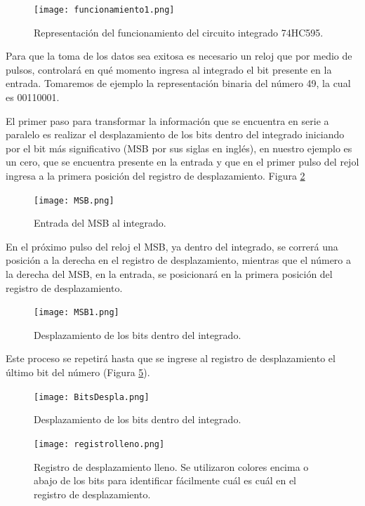 \documentclass{article}
\begin{document}
\newpage

\begin{figure}[h]
\texttt{[image: funcionamiento1.png]}
\centering
\caption{Representación del funcionamiento del circuito integrado 74HC595.}
\label{fig:func1}
\end{figure}

Para que la toma de los datos sea exitosa es necesario un reloj que por medio de pulsos, controlará en qué momento ingresa al integrado el bit presente en la entrada. Tomaremos de ejemplo la representación binaria del número 49, la cual es 00110001.

El primer paso para transformar la información que se encuentra en serie a paralelo es realizar el desplazamiento de los bits dentro del integrado iniciando por el bit más significativo (MSB por sus siglas en inglés), en nuestro ejemplo es un cero, que se encuentra presente en la entrada y que en el primer pulso del rejol ingresa a la primera posición del registro de desplazamiento. Figura \ref{fig:MSB}

\begin{figure}[h]
\texttt{[image: MSB.png]}
\centering
\caption{Entrada del MSB al integrado.}
\label{fig:MSB}
\end{figure}

En el próximo pulso del reloj el MSB, ya dentro del integrado, se correrá una posición a la derecha en el registro de desplazamiento, mientras que el número a la derecha del MSB, en la entrada, se posicionará en la primera posición del registro de desplazamiento.


\begin{figure}[h]
\texttt{[image: MSB1.png]}
\centering
\caption{Desplazamiento de los bits dentro del integrado.}
\label{fig:MSB1}
\end{figure}

Este proceso se repetirá hasta que se ingrese al registro de desplazamiento el último bit del número (Figura \ref{fig:registrolleno}).

\begin{figure}[h]
\texttt{[image: BitsDespla.png]}
\centering
\caption{Desplazamiento de los bits dentro del integrado.}
\label{fig:bitsdespla}
\end{figure}

\newpage
\begin{figure}[h]
\texttt{[image: registrolleno.png]}
\centering
\caption{Registro de desplazamiento lleno. Se utilizaron colores encima o abajo de los bits para identificar fácilmente cuál es cuál en el registro de desplazamiento.}
\label{fig:registrolleno}
\end{figure}
\end{document}
